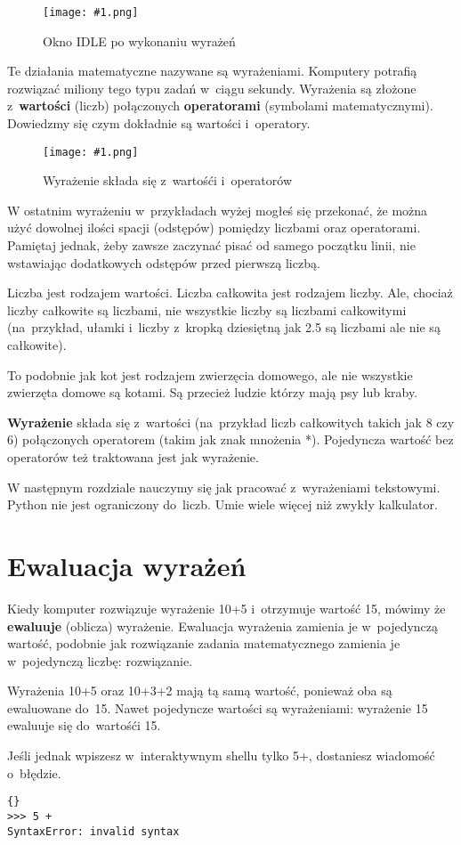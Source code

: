 \documentclass{book}
\newcommand{\img}[3]{
\begin{figure}
\centerline{
	\texttt{[image: \#1.png]}
}
\caption{#2}
\label{#1}
\end{figure}
}
\begin{document}
\img{idle-wyrazenia}{Okno IDLE po wykonaniu wyrażeń}{7 cm}

Te działania matematyczne nazywane są wyrażeniami. Komputery potrafią rozwiązać miliony tego typu zadań w~ciągu sekundy. Wyrażenia są złożone z~{\bf wartości} (liczb) połączonych {\bf operatorami} (symbolami matematycznymi). Dowiedzmy się czym dokładnie są wartości i~operatory.

\img{idle-wyroperwart}{Wyrażenie składa się z~wartośći i~operatorów}{3 cm}

W ostatnim wyrażeniu w~przykładach wyżej mogłeś się przekonać, że można użyć dowolnej ilości spacji (odstępów) pomiędzy liczbami oraz operatorami. Pamiętaj jednak, żeby zawsze zaczynać pisać od samego początku linii, nie wstawiając dodatkowych odstępów przed pierwszą liczbą.

Liczba jest rodzajem wartości. Liczba całkowita jest rodzajem liczby. Ale, chociaż liczby całkowite są liczbami, nie wszystkie liczby są liczbami całkowitymi (na~przykład, ułamki i~liczby z~kropką dziesiętną jak 2.5 są liczbami ale nie są całkowite).

To podobnie jak kot jest rodzajem zwierzęcia domowego, ale nie wszystkie zwierzęta domowe są kotami. Są przecież ludzie którzy mają psy lub kraby. 

{\bf Wyrażenie} składa się z~wartości (na~przykład liczb całkowitych takich jak 8 czy 6) połączonych operatorem (takim jak znak mnożenia *). Pojedyncza wartość bez operatorów też traktowana jest jak wyrażenie.

W następnym rozdziale nauczymy się jak pracować z~wyrażeniami tekstowymi. Python nie jest ograniczony do~liczb. Umie wiele więcej niż zwykły kalkulator.

\section{Ewaluacja wyrażeń}

Kiedy komputer rozwiązuje wyrażenie 10+5 i~otrzymuje wartość 15, mówimy że {\bf ewaluuje} (oblicza) wyrażenie. Ewaluacja wyrażenia zamienia je w~pojedynczą wartość, podobnie jak rozwiązanie zadania matematycznego zamienia je w~pojedynczą liczbę: rozwiązanie.

Wyrażenia 10+5 oraz 10+3+2 mają tą samą wartość, ponieważ oba są ewaluowane do~15. Nawet pojedyncze wartości są wyrażeniami: wyrażenie 15 ewaluuje się do~wartośći 15.

Jeśli jednak wpiszesz w~interaktywnym shellu tylko 5+, dostaniesz wiadomość o~błędzie.
\lstset{language=python}
\begin{lstlisting}{}
>>> 5 +
SyntaxError: invalid syntax
\end{lstlisting}
\end{document}
